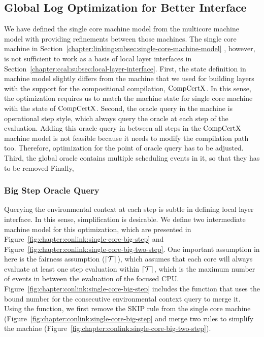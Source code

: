 \subsection{Global Log Optimization for Better Interface}
\label{chapter:linking:subsec:global-log-optimization}

We have defined the single core machine model from the multicore machine model 
with providing refinements between those machines. 
The single core machine in Section~\ref{chapter:linking:subsec:single-core-machine-model} , however, 
is not sufficient to work as a 
basis of local layer interfaces in Section~\ref{chapter:ccal:subsec:local-layer-interface}.
First, the state definition in machine model 
slightly differs from the machine that we used for 
building layers with the support for the compositional compilation, $\mathrm{CompCertX}$. 
In this sense, the optimization requires us to match the machine state for single core machine with the state of $\mathrm{CompCertX}$. 
Second, the oracle query in the machine is operational step style, 
which always query the oracle at each step of the evaluation.
Adding this oracle query in between all steps in the $\mathrm{CompCertX}$ machine model 
is not feasible because it needs to modify the compilation path too. 
Therefore, 
optimization for the point of oracle query has to be adjusted. 
Third, the global oracle contains multiple scheduling events in it, 
so that they has to be removed 
Finally, 

\subsubsection{Big Step Oracle Query}


Querying the environmental context at each step is subtle in defining local layer interface. 
In this sense, simplification is desirable. 
We define two intermediate machine model for this optimization,
which are presented in Figure~\ref{fig:chapter:conlink:single-core-big-step} and Figure~\ref{fig:chapter:conlink:single-core-big-two-step}.
One important assumption in here is the fairness assumption (${\lceil{\mathcal{T}}\rceil}$),
which assumes that each core will always evaluate at least one step evaluation within ${\lceil{\mathcal{T}}\rceil}$, which is the maximum number
of events in between the evaluation of the focused CPU. 
Figure~\ref{fig:chapter:conlink:single-core-big-step} includes the function 
that uses the bound number for the consecutive environmental context query 
to merge it. 
Using the function, we first remove the \textsf{SKIP} rule from the single core machine (Figure~\ref{fig:chapter:conlink:single-core-big-step}
and merge two rules to simplify the machine (Figure~\ref{fig:chapter:conlink:single-core-big-two-step}).

